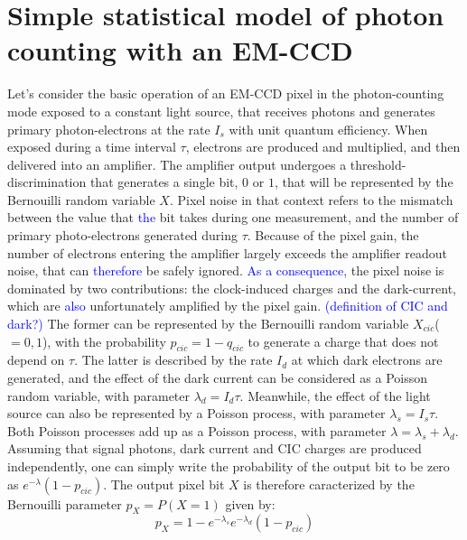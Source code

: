 \documentclass{article}
\begin{document}
\section*{Simple statistical model of photon counting with an EM-CCD}

Let's consider the basic operation of an EM-CCD pixel in the photon-counting mode exposed to a constant light source, that receives photons and generates primary photon-electrons at the rate $I_{s}$ with unit quantum efficiency. 
When exposed during a time interval $\tau$, electrons are produced and multiplied, and then delivered into an amplifier. 
The amplifier output undergoes a threshold-discrimination that generates a single bit, $0$ or $1$, that will be represented by the Bernouilli random variable $X$.
Pixel noise in that context refers to the mismatch between the value that \textcolor{blue}{the} bit takes during one measurement, and the number of primary photo-electrons generated during $\tau$.
Because of the pixel gain, the number of electrons entering the amplifier largely exceeds the amplifier readout noise, that can \textcolor{blue}{therefore} be safely ignored.
\textcolor{blue}{As a consequence}, the pixel noise is dominated by two contributions: the clock-induced charges and the dark-current, which are \textcolor{blue}{also} unfortunately amplified by the pixel gain.
\textcolor{blue}{(definition of CIC and dark?)} The former can be represented by the Bernouilli random variable $X_{cic}$($=0,1$), with the probability $p_{cic}=1-q_{cic}$ to generate a charge that does not depend on $\tau$.
The latter is described by the rate $I_{d}$ at which dark electrons are generated, and the effect of the dark current can be considered as a Poisson random variable, with parameter $\lambda_{d}=I_{d} \tau$.
Meanwhile, the effect of the light source can also be represented by a Poisson process, with parameter $\lambda_{s}=I_{s} \tau$.
Both Poisson processes add up as a Poisson process, with parameter $\lambda = \lambda_{s} + \lambda_{d}$.
Assuming that signal photons, dark current and CIC charges are produced independently, one can simply write the probability of the output bit to be zero as $e^{-\lambda}(1-p_{cic})$.
The output pixel bit $X$ is therefore caracterized by the Bernouilli parameter $p_{X} = P(X=1)$ given by: 
\begin{equation}
\label{eq:Bernouilli_pixel}
p_{X} = 1 - e^{-\lambda_{s}} e^{-\lambda_{d}} (1-p_{cic})
\end{equation}
\end{document}
